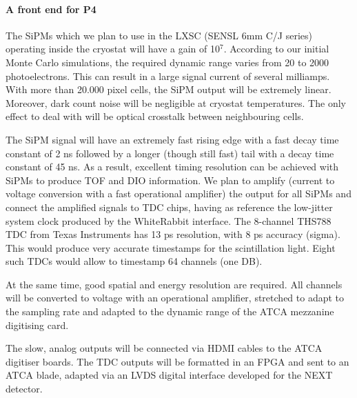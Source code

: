 \paragraph{A front end for P4}
%
The SiPMs which we plan to use in the LXSC (SENSL 6mm C/J series)
operating inside the cryostat will have a gain of 10$^7$. According to our initial Monte Carlo simulations, the required dynamic range varies from 20 to 2000 photoelectrons.  This can result in a large signal current of several milliamps. With more than 20.000  pixel cells, the SiPM output will be extremely linear. Moreover, dark count noise will be negligible at cryostat temperatures. The only effect to deal with will be optical crosstalk between neighbouring cells. %

The SiPM signal will have an extremely fast rising edge with a fast decay time constant of 2 ns followed by a longer (though still fast) tail with a decay time constant of 45 ns. As a result, excellent timing resolution can be achieved with SiPMs to produce TOF and DIO information. We plan to amplify (current to voltage conversion with a fast operational amplifier) the output for all SiPMs and connect the amplified signals to TDC chips, having as reference the low-jitter system clock produced by the WhiteRabbit interface. The 8-channel THS788 TDC from Texas Instruments has 13 ps resolution, with 8 ps accuracy (sigma). This would produce very accurate timestamps for the scintillation light. 
Eight such TDCs would allow to timestamp 64 channels (one DB).

At the same time, good spatial and energy resolution are required. All channels will be converted to voltage with an operational amplifier, stretched to adapt to the sampling rate and adapted to the dynamic range of the ATCA mezzanine digitising card.

The slow, analog outputs will be connected via HDMI cables to the ATCA digitiser boards. The TDC outputs will be formatted in an FPGA and sent to an ATCA blade, adapted via an LVDS digital interface developed for the NEXT detector.
%
%

